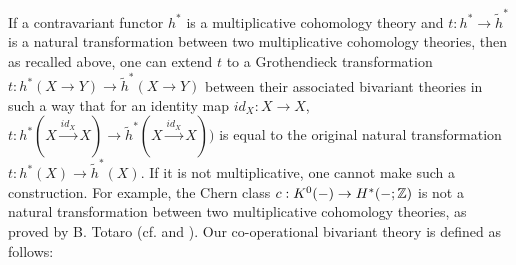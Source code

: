 \documentclass[a4paper]{amsart}
\begin{document}
If a contravariant functor $h^*$ is a multiplicative cohomology theory and $t: h^* \to \widetilde h^*$ is a natural transformation between two multiplicative cohomology theories, then as recalled above, one can extend $t$ to a Grothendieck transformation $t:h^*(X \to Y) \to \widetilde h^*(X \to Y)$ between their associated bivariant theories in such a way that for an identity map $id_X:X \to X$, $t:h^*(X \xrightarrow {id_X} X) \to \widetilde h^*(X \xrightarrow {id_X} X))$ is equal to the original natural transformation $t:h^*(X) \to \widetilde h^*(X)$. If it is not multiplicative, one cannot make such a construction. For example, the Chern class $c: K^0(-) \to H^*(-;\mathbb Z)$ is not a natural transformation between two multiplicative cohomology theories, as proved by B. Totaro \cite{Totaro} (cf. \cite{Groth} and \cite{Segal}).
Our co-operational bivariant theory is defined as follows:
\end{document}

